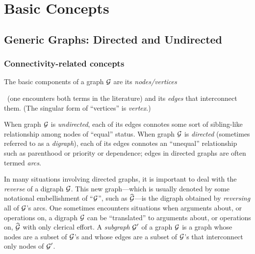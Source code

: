 \section{Basic Concepts}
\label{sec:basic-graphs}

\subsection{Generic Graphs: Directed and Undirected}
\label{sec:graphs-generic}

\subsubsection{Connectivity-related concepts}
\label{sec:connectivity-notions}

The basic components of a graph $\mbox{$\cal G$}$ are 
   
  its {\em nodes/vertices}
  ~(one encounters both terms in the
literature) and its {\em edges} 
 that interconnect them.  (The singular form
of ``vertices'' is {\it vertex}.)   

When graph $\mbox{$\cal G$}$ is {\em undirected},  each of
its edges connotes some sort of sibling-like relationship among nodes
of ``equal'' status.  When graph $\mbox{$\cal G$}$ is {\em directed}
 (sometimes referred to as a {\em digraph}),
  each of its edges connotes an
``unequal'' relationship such as parenthood or priority or dependence;
edges in directed graphs are often termed {\em
  arcs}.  

In many situations involving directed graphs, it is important to
deal with the {\em reverse}  of a digraph $\mbox{$\cal G$}$. 
This new graph---which is usually denoted by some notational
embellishment of ``$\mbox{$\cal G$}$'', such as $\widehat{\mbox{$\cal G$}}$---is the digraph
obtained by {\em reversing} all of $\mbox{$\cal G$}$'s arcs.  One sometimes
encounters situations when arguments about, or operations on, a
digraph $\mbox{$\cal G$}$ can be ``translated'' to arguments about, or operations
on, $\widehat{\mbox{$\cal G$}}$ with only clerical effort.  A {\em subgraph} $\mbox{$\cal G$}'$
of a graph $\mbox{$\cal G$}$ is a graph whose nodes are a subset of $\mbox{$\cal G$}$'s and
whose edges are a subset of $\mbox{$\cal G$}$'s that interconnect only nodes of $\mbox{$\cal G$}'$.  
\medskip

